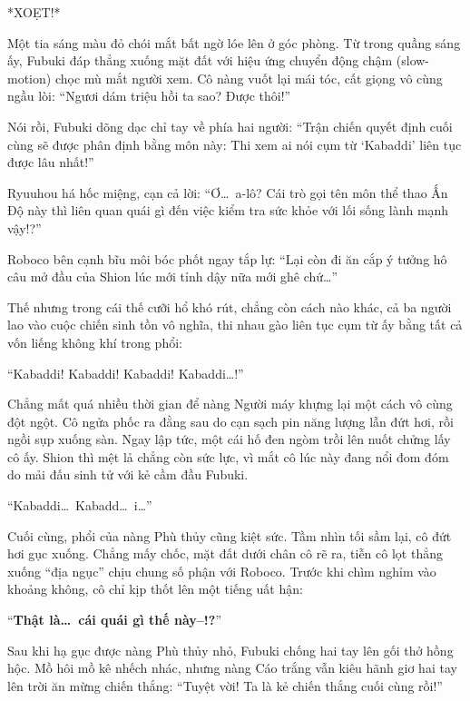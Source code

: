 \documentclass[../main.tex]{subfiles}
\begin{document}
*XOẸT!*

Một tia sáng màu đỏ chói mắt bất ngờ lóe lên ở góc phòng. Từ trong quầng sáng ấy, Fubuki đáp thẳng xuống mặt đất với hiệu ứng chuyển động chậm (slow-motion) chọc mù mắt người xem. Cô nàng vuốt lại mái tóc, cất giọng vô cùng ngầu lòi: ``Ngươi dám triệu hồi ta sao? Được thôi!''


Nói rồi, Fubuki dõng dạc chỉ tay về phía hai người: ``Trận chiến quyết định cuối cùng sẽ được phân định bằng môn này: Thi xem ai nói cụm từ `Kabaddi' liên tục được lâu nhất!''

Ryuuhou há hốc miệng, cạn cả lời: ``Ơ\dots\ a-lô? Cái trò gọi tên môn thể thao Ấn Độ này thì liên quan quái gì đến việc kiểm tra sức khỏe với lối sống lành mạnh vậy!?''

Roboco bên cạnh bĩu môi bóc phốt ngay tắp lự: ``Lại còn đi ăn cắp ý tưởng hô câu mở đầu của Shion lúc mới tỉnh dậy nữa mới ghê chứ\dots''

Thế nhưng trong cái thế cưỡi hổ khó rút, chẳng còn cách nào khác, cả ba người lao vào cuộc chiến sinh tồn vô nghĩa, thi nhau gào liên tục cụm từ ấy bằng tất cả vốn liếng không khí trong phổi:

``Kabaddi! Kabaddi! Kabaddi! Kabaddi\dots!''


Chẳng mất quá nhiều thời gian để nàng Người máy khựng lại một cách vô cùng đột ngột. Cô ngửa phốc ra đằng sau do cạn sạch pin năng lượng lẫn đứt hơi, rồi ngồi sụp xuống sàn. Ngay lập tức, một cái hố đen ngòm trồi lên nuốt chửng lấy cô ấy. Shion thì mệt lả chẳng còn sức lực, vì mắt cô lúc này đang nổi đom đóm do mải đấu sinh tử với kẻ cầm đầu Fubuki.

``Kabaddi\dots\ Kabadd\dots\ i\dots''

Cuối cùng, phổi của nàng Phù thủy cũng kiệt sức. Tầm nhìn tối sầm lại, cô đứt hơi gục xuống. Chẳng mấy chốc, mặt đất dưới chân cô rẽ ra, tiễn cô lọt thẳng xuống ``địa ngục'' chịu chung số phận với Roboco. Trước khi chìm nghỉm vào khoảng không, cô chỉ kịp thốt lên một tiếng uất hận:

``\textbf{Thật là\dots\ cái quái gì thế này--!?}''

Sau khi hạ gục được nàng Phù thủy nhỏ, Fubuki chống hai tay lên gối thở hồng hộc. Mồ hôi mồ kê nhếch nhác, nhưng nàng Cáo trắng vẫn kiêu hãnh giơ hai tay lên trời ăn mừng chiến thắng: ``Tuyệt vời! Ta là kẻ chiến thắng cuối cùng rồi!''

\end{document}
